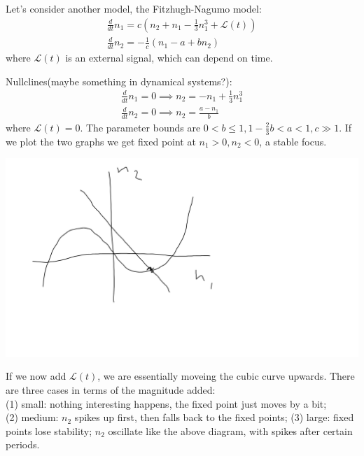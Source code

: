 \documentclass[a4paper]{article}
\begin{document}
Let's consider another model, the Fitzhugh-Nagumo model:
\begin{equation*}
\begin{aligned}
\frac{d}{dt} n_1 = c(n_2+n_1 - \frac{1}{3} n_1^3 + \mathcal{L}(t))\\
\frac{d}{dt} n_2 = -\frac{1}{c} (n_1 - a+bn_2)
\end{aligned}
\end{equation*}
where $\mathcal{L}(t)$ is an external signal, which can depend on time.

Nullclines(maybe something in dynamical systems?):\\
\begin{equation*}
\begin{aligned}
\frac{d}{dt} n_1 = 0 \implies n_2 = -n_1 + \frac{1}{3} n_1^3\\
\frac{d}{dt} n_2 = 0 \implies n_2 = \frac{a-n_1}{b}
\end{aligned}
\end{equation*}
where $\mathcal{L}(t) = 0$. The parameter bounds are $0<b\leq 1, 1-\frac{2}{3} b < a < 1, c \gg 1$. If we plot the two graphs we get fixed point at $n_1>0,n_2<0$, a stable focus.

\includegraphics[scale=0.5]{image/Bio_15.png}

If we now add $\mathcal{L}(t)$, we are essentially moveing the cubic curve upwards. There are three cases in terms of the magnitude added:\\
(1) small: nothing interesting happens, the fixed point just moves by a bit;\\
(2) medium: $n_2$ spikes up first, then falls back to the fixed points;
(3) large: fixed points lose stability; $n_2$ oscillate like the above diagram, with spikes after certain periods.

\end{document}
